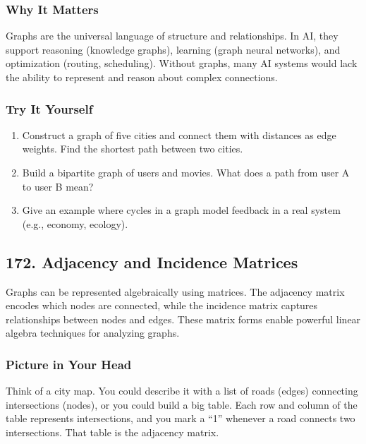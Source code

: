\documentclass[
  letterpaper,
  DIV=11,
  numbers=noendperiod]{scrreprt}
\providecommand{\tightlist}{%
  \setlength{\itemsep}{0pt}\setlength{\parskip}{0pt}}
\begin{document}
\subsubsection{Why It Matters}\label{why-it-matters-68}

Graphs are the universal language of structure and relationships. In AI,
they support reasoning (knowledge graphs), learning (graph neural
networks), and optimization (routing, scheduling). Without graphs, many
AI systems would lack the ability to represent and reason about complex
connections.

\subsubsection{Try It Yourself}\label{try-it-yourself-170}

\begin{enumerate}
\def\labelenumi{\arabic{enumi}.}
\tightlist
\item
  Construct a graph of five cities and connect them with distances as
  edge weights. Find the shortest path between two cities.
\item
  Build a bipartite graph of users and movies. What does a path from
  user A to user B mean?
\item
  Give an example where cycles in a graph model feedback in a real
  system (e.g., economy, ecology).
\end{enumerate}

\subsection{172. Adjacency and Incidence
Matrices}\label{adjacency-and-incidence-matrices}

Graphs can be represented algebraically using matrices. The adjacency
matrix encodes which nodes are connected, while the incidence matrix
captures relationships between nodes and edges. These matrix forms
enable powerful linear algebra techniques for analyzing graphs.

\subsubsection{Picture in Your Head}\label{picture-in-your-head-171}

Think of a city map. You could describe it with a list of roads (edges)
connecting intersections (nodes), or you could build a big table. Each
row and column of the table represents intersections, and you mark a
``1'' whenever a road connects two intersections. That table is the
adjacency matrix.
\end{document}
